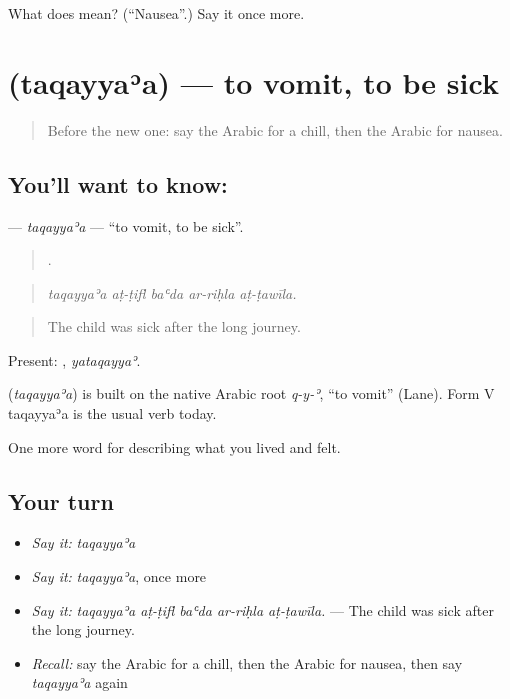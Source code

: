 \begin{tcolorbox}[breakable,colback=teal!4,colframe=teal!35!black,title={Before you move on}]
What does  mean? (\textquotedblleft{}Nausea\textquotedblright{}.) Say it once more.
\end{tcolorbox}
\section[\texorpdfstring{\ar{تقيأ} (taqayyaʾa)}{تقيأ (taqayyaʾa)}]{ (taqayyaʾa) — to vomit, to be sick}

\label{lesson:AR-C507-taqayyaa}



\begin{quote}
Before the new one: say the Arabic for a chill, then the Arabic for nausea.
\end{quote}

\subsection*{You'll want to know: }
\textbf{} — \emph{taqayyaʾa} — \textquotedblleft{}to vomit, to be sick\textquotedblright{}.

\begin{quote}
    .
\end{quote}

\begin{quote}
\emph{taqayyaʾa aṭ-ṭifl baʿda ar-riḥla aṭ-ṭawīla.}
\end{quote}

\begin{quote}
The child was sick after the long journey.
\end{quote}

Present: , \emph{yataqayyaʾ}.

\begin{cousinweb}
\textbf{} (\emph{taqayyaʾa}) is built on the native Arabic root \emph{q-y-ʾ}, \textquotedblleft{}to vomit\textquotedblright{} (Lane). Form V taqayyaʾa is the usual verb today.
\end{cousinweb}

\begin{grammarlens}[title={What you've built}]
One more word for describing what you lived and felt.
\end{grammarlens}

\subsection*{Your turn}
\begin{itemize}
\raggedright
  \item \emph{Say it:} \emph{taqayyaʾa}
  \item \emph{Say it:} \emph{taqayyaʾa}, once more
  \item \emph{Say it:} \emph{taqayyaʾa aṭ-ṭifl baʿda ar-riḥla aṭ-ṭawīla.} — The child was sick after the long journey.
  \item \emph{Recall:} say the Arabic for a chill, then the Arabic for nausea, then say \emph{taqayyaʾa} again
\end{itemize}

